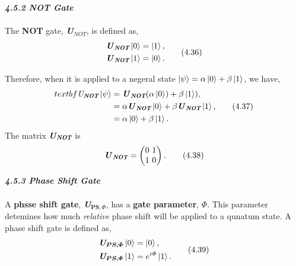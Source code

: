 \documentclass{article}
\begin{document}
\textit{\textbf{\large 4.5.2 NOT Gate}}\\\\
The \textbf{NOT} gate, \textbf{\textit{U}}$_{NOT}$, is defined as,
\begin{align} \label{eq 4.36}
    \begin{split}
        \textbf{\textit{U}}_{\textit{\textbf{NOT}}}\ket{0}=\ket{1},\\
        \textbf{\textit{U}}_{\textit{\textbf{NOT}}}\ket{1}=\ket{0}.
    \end{split} \tag{4.36}
\end{align}

Therefore, when it is applied to a negeral state $\ket{\psi}=\alpha\ket{0}+\beta\ket{1}$, we have,
\begin{align} \label{eq 4.37}
    \begin{split}
        textbf{\textit{U}}_{\textit{\textbf{NOT}}}\ket{\psi}&=\textbf{\textit{U}}_{\textit{\textbf{NOT}}}(\alpha\ket{0})+\beta\ket{1}),\\
        &= \alpha\textbf{\textit{U}}_{\textit{\textbf{NOT}}}\ket{0}+\beta\textbf{\textit{U}}_{\textit{\textbf{NOT}}}\ket{1},\\
        &= \alpha\ket{0}+\beta\ket{1}.
    \end{split} \tag{4.37}
\end{align}
The matrix \textbf{\textit{U}}$_{\textit{\textbf{NOT}}}$ is
\begin{equation} \label{eq 4.38}
    \textbf{\textit{U}}_{\textit{\textbf{NOT}}}=\begin{pmatrix}
        0\ 1 \\ 1\ 0
    \end{pmatrix}.\tag{4.38}
\end{equation}

\textit{\textbf{\large 4.5.3 Phase Shift Gate}}\\\\
A \textbf{phsse shift gate}, \textbf{\textit{U}}$_{\boldsymbol{PS,\varPhi}}$, 
has a \textbf{gate parameter}, $\boldsymbol{\varPhi}$. This parameter detemines how much 
\textit{relative} phase shift will be applied to a qunatum state.
A phase shift gate is defined as,
\begin{align} \label{eq 4.39}
    \begin{split}
        \textit{\textbf{U}}_{\boldsymbol{PS,\varPhi}}\ket{0}&=\ket{0},\\
        \textit{\textbf{U}}_{\boldsymbol{PS,\varPhi}}\ket{1}&=e^{i\varPhi}\ket{1}.
    \end{split} \tag{4.39}
\end{align}
\end{document}
